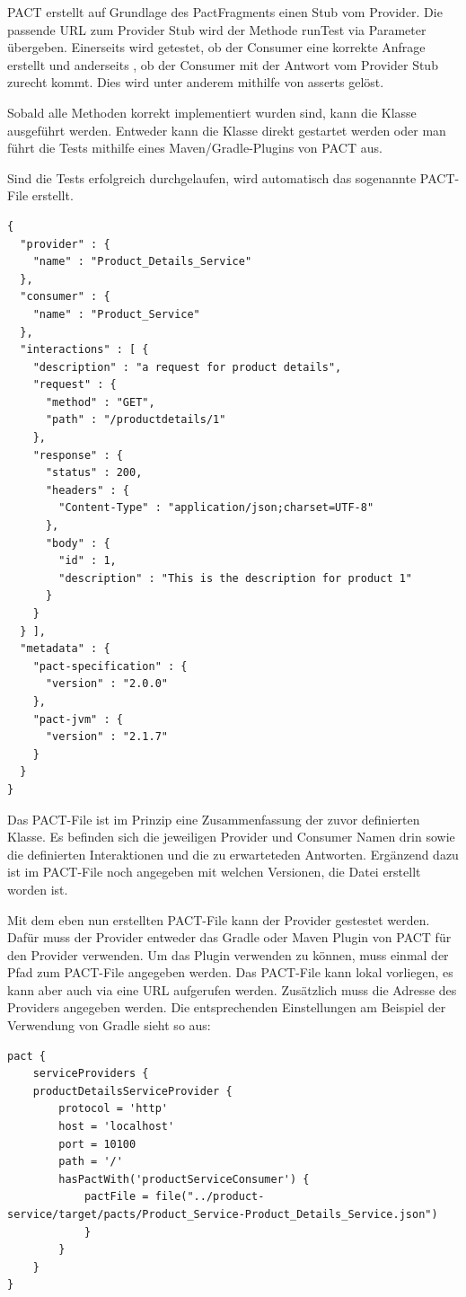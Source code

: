 \documentclass{llncs}
\begin{document}
PACT erstellt auf Grundlage des PactFragments einen Stub vom Provider. Die passende URL zum Provider Stub wird der Methode runTest via Parameter übergeben. Einerseits wird getestet, ob der Consumer eine korrekte Anfrage erstellt und anderseits , ob der Consumer mit der Antwort vom Provider Stub zurecht kommt. Dies wird unter anderem mithilfe von asserts gelöst.

Sobald alle Methoden korrekt implementiert wurden sind, kann die Klasse ausgeführt werden. Entweder kann die Klasse direkt gestartet werden oder man führt die Tests mithilfe eines Maven/Gradle-Plugins von PACT aus.

Sind die Tests erfolgreich durchgelaufen, wird automatisch das sogenannte PACT-File erstellt.

\lstset{language = Java}
\begin{lstlisting}
{
  "provider" : {
    "name" : "Product_Details_Service"
  },
  "consumer" : {
    "name" : "Product_Service"
  },
  "interactions" : [ {
    "description" : "a request for product details",
    "request" : {
      "method" : "GET",
      "path" : "/productdetails/1"
    },
    "response" : {
      "status" : 200,
      "headers" : {
        "Content-Type" : "application/json;charset=UTF-8"
      },
      "body" : {
        "id" : 1,
        "description" : "This is the description for product 1"
      }
    }
  } ],
  "metadata" : {
    "pact-specification" : {
      "version" : "2.0.0"
    },
    "pact-jvm" : {
      "version" : "2.1.7"
    }
  }
}
\end{lstlisting}

Das PACT-File ist im Prinzip eine Zusammenfassung der zuvor definierten Klasse. Es befinden sich die jeweiligen Provider und Consumer Namen drin sowie die definierten Interaktionen und die zu erwarteteden Antworten. Ergänzend dazu ist im PACT-File noch angegeben mit welchen Versionen, die Datei erstellt worden ist.

Mit dem eben nun erstellten PACT-File kann der Provider gestestet werden. Dafür muss der Provider entweder das Gradle oder Maven Plugin von PACT für den Provider verwenden. Um das Plugin verwenden zu können, muss einmal der Pfad zum PACT-File angegeben werden. Das PACT-File kann lokal vorliegen, es kann aber auch via eine URL aufgerufen werden. Zusätzlich muss die Adresse des Providers angegeben werden. Die entsprechenden Einstellungen am Beispiel der Verwendung von Gradle sieht so aus:

\lstset{language = Java}
\begin{lstlisting}
pact {
    serviceProviders {
    productDetailsServiceProvider {
        protocol = 'http'
        host = 'localhost'
        port = 10100
        path = '/'
        hasPactWith('productServiceConsumer') {
            pactFile = file("../product-service/target/pacts/Product_Service-Product_Details_Service.json")
			}
		}
	}
}
\end{lstlisting}
\end{document}
